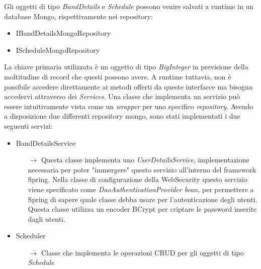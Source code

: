 Gli oggetti di tipo \textsl{BandDetails} e \textsl{Schedule} possono venire salvati a runtime in un database Mongo, rispettivamente nei repository:
\begin{itemize}
	\item IBandDetailsMongoRepository
	\item IScheduleMongoRepository
\end{itemize}
La chiave primaria utilizzata è un oggetto di tipo \textsl{BigInteger} in previsione della moltitudine di record che questi possono avere.\newline\newline
A runtime tuttavia, non è possibile accedere direttamente ai metodi offerti da queste interfacce ma bisogna accedervi attraverso dei \textsl{Services}.\newline
Una classe che implementa un servizio può essere intuitivamente vista come un \textsl{wrapper} per uno specifico \textsl{repository}. Avendo a disposizione due differenti repository mongo, sono stati implementati i due seguenti servizi:
\begin{itemize}
	\item BandDetailsService
	\begin{itemize}
		\item[$\rightarrow$] Questa classe implementa uno \textsl{UserDetailsService}, implementazione necessaria per poter "immergere" questo servizio all'interno del framework Spring. Nella classe di configurazione della WebSecurity questo servizio viene specificato come \textsl{DaoAuthenticationProvider bean}, per permettere a Spring di sapere quale classe debba usare per l'autenticazione degli utenti. Questa classe utilizza un encoder BCrypt per criptare le password inserite dagli utenti.
	\end{itemize}
	\item Scheduler
	\begin{itemize}
		\item[$\rightarrow$] Classe che implementa le operazioni CRUD per gli oggetti di tipo \textsl{Schedule}
	\end{itemize}
\end{itemize}

